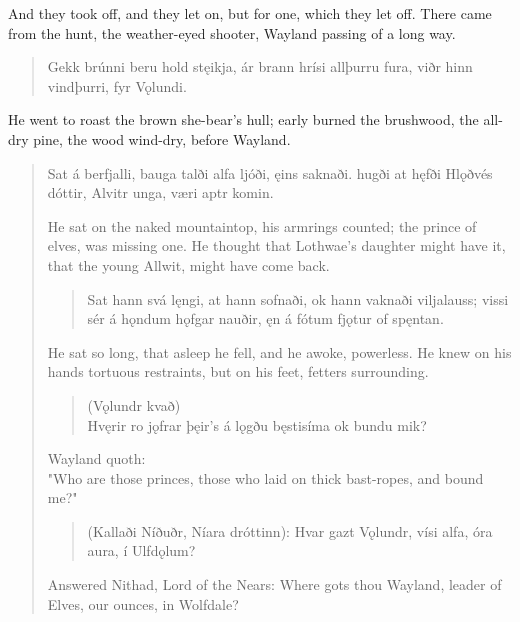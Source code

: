 \bvb And they took off, and they let on, but for one, which they let off. There came from the hunt, the weather-eyed shooter, Wayland passing of a long way. \\

\begin{verse}
\bva Gekk brúnni \hld beru hold stęikja,
ár brann hrísi \hld allþurru fura,
viðr hinn vindþurri, \hld fyr Vǫlundi. \\%
\end{verse}

\bvb He went to roast the brown she-bear's hull; early burned the brushwood, the all-dry pine, the wood wind-dry, before Wayland.

\begin{verse}
\bva Sat á berfjalli, \hld bauga talði
alfa ljóði, \hld ęins saknaði.
hugði at hęfði \hld Hlǫðvés dóttir,
Alvitr unga, \hld væri aptr komin.
 
\bvb He sat on the naked mountaintop, his armrings counted; the prince of elves, was missing one. He thought that Lothwae's daughter might have it, that the young Allwit, might have come back.

\begin{verse}
\bva Sat hann svá lęngi, \hld at hann sofnaði,
ok hann vaknaði \hld viljalauss;
vissi sér á hǫndum \hld hǫfgar nauðir,
ęn á fótum \hld fjǫtur of spęntan. \\%
\end{verse}

\bvb He sat so long, that asleep he fell, and he awoke, powerless. He knew on his hands tortuous restraints, but on his feet, fetters surrounding.

\begin{verse}
(Vǫlundr kvað) \\
\bva Hvęrir ro jǫfrar \hld þęir's á lǫgðu
bęstisíma \hld ok bundu mik? \\%
\end{verse}

\bvb Wayland quoth: \\
"Who are those princes, those who laid on thick bast-ropes, and bound me?"

\begin{verse}
\bva (Kallaði Níðuðr, \hld Níara dróttinn):
Hvar gazt Vǫlundr, \hld vísi alfa,
óra aura, \hld í Ulfdǫlum? \\%

\end{verse}

\bvb Answered Nithad, Lord of the Nears: Where gots thou Wayland, leader of Elves, our ounces, in Wolfdale?


\end{verse}
